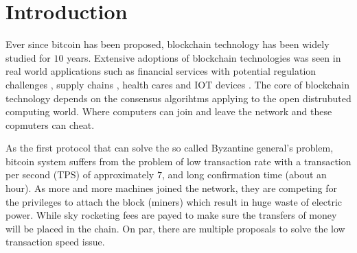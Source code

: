 \section{Introduction}
Ever since bitcoin \cite{nakamoto2008bitcoin} has been proposed, blockchain technology has been widely studied for $10$ years. 
Extensive adoptions of blockchain technologies was seen in real world applications such as 
financial services with potential regulation challenges \cite{michael2018blockchain, tapscott2017blockchain}, 
supply chains \cite{korpela2017digital,tian2016agri, abeyratne2016blockchain}, 
health cares \cite{azaria2016medrec,yue2016healthcare} and IOT devices \cite{christidis2016blockchains}.
The core of blockchain technology depends on the consensus algorihtms applying to the open distrubuted computing world.
Where computers can join and leave the network and these copmuters can cheat.

As the first protocol that can solve the so called Byzantine general's problem, 
bitcoin system suffers from the problem of low transaction rate with a transaction per second (TPS) of approximately $7$, and long confirmation time (about an hour).
As more and more machines joined the network, they are competing for the privileges to attach the block (miners) which result in huge waste of electric power.
While sky rocketing fees are payed to make sure the transfers of money will be placed in the chain.
On par, there are multiple proposals to solve the low transaction speed issue. 

